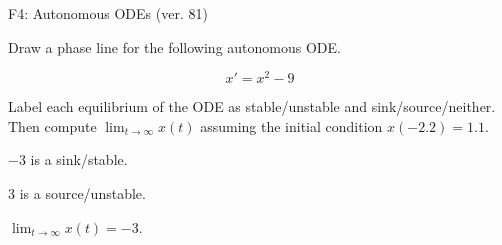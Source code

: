 \begin{exercise}
  \begin{exerciseTitle}F4: Autonomous ODEs (ver. 81)\end{exerciseTitle}
  \begin{exerciseStatement}
    

      Draw a phase line for the following 
      autonomous ODE.
    

    
\[x'= x^{2} - 9\]

    

      Label each equilibrium of the ODE
      as stable/unstable and sink/source/neither.
      Then compute \(\lim_{t\to\infty}x(t)\)
      assuming the initial condition
      \(x( -2.2 )= 1.1\).
    

  \end{exerciseStatement}
  \begin{exerciseAnswer}
    

      \(-3\) is a sink/stable.
      
      \(3\) is a source/unstable.
    

    

      \(\lim_{t\to\infty}x(t)=-3\).
    

  \end{exerciseAnswer}
\end{exercise}